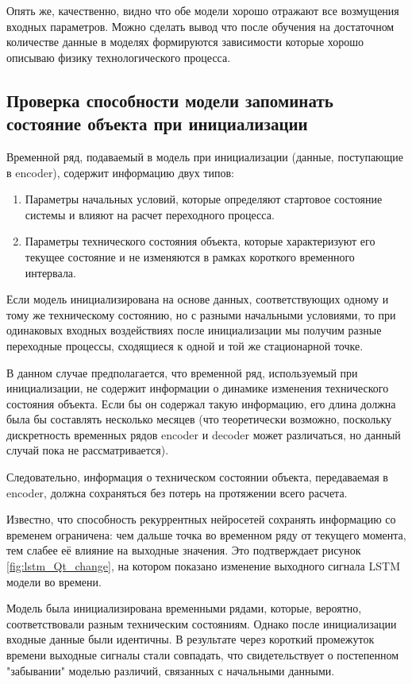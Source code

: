 \documentclass[12pt,a4paper]{article}
\begin{document}
Опять же, качественно, видно что обе модели хорошо отражают все возмущения входных параметров. Можно сделать вывод что после обучения на достаточном количестве данные в моделях формируются зависимости которые хорошо описываю физику технологического процесса.

\newpage
\subsection{Проверка способности модели запоминать состояние объекта при инициализации}

Временной ряд, подаваемый в модель при инициализации (данные, поступающие в encoder), содержит информацию двух типов:

\begin{enumerate}
	\item Параметры начальных условий, которые определяют стартовое состояние системы и влияют на расчет переходного процесса.
	\item Параметры технического состояния объекта, которые характеризуют его текущее состояние и не изменяются в рамках короткого временного интервала.
\end{enumerate}

Если модель инициализирована на основе данных, соответствующих одному и тому же техническому состоянию, но с разными начальными условиями, то при одинаковых входных воздействиях после инициализации мы получим разные переходные процессы, сходящиеся к одной и той же стационарной точке.

В данном случае предполагается, что временной ряд, используемый при инициализации, не содержит информации о динамике изменения технического состояния объекта. Если бы он содержал такую информацию, его длина должна была бы составлять несколько месяцев (что теоретически возможно, поскольку дискретность временных рядов encoder и decoder может различаться, но данный случай пока не рассматривается).

Следовательно, информация о техническом состоянии объекта, передаваемая в encoder, должна сохраняться без потерь на протяжении всего расчета.

Известно, что способность рекуррентных нейросетей сохранять информацию со временем ограничена: чем дальше точка во временном ряду от текущего момента, тем слабее её влияние на выходные значения. Это подтверждает рисунок \ref{fig:lstm_Qt_change}, на котором показано изменение выходного сигнала LSTM модели во времени.

Модель была инициализирована временными рядами, которые, вероятно, соответствовали разным техническим состояниям. Однако после инициализации входные данные были идентичны. В результате через короткий промежуток времени выходные сигналы стали совпадать, что свидетельствует о постепенном "забывании" моделью различий, связанных с начальными данными.
\end{document}
